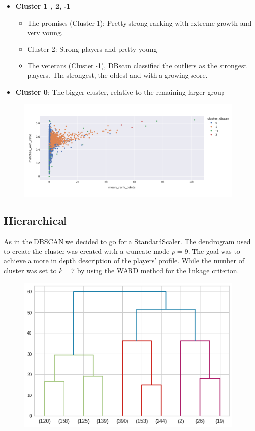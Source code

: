\documentclass{article}
\begin{document}
\begin{itemize}
\item \textbf{Cluster 1 , 2, -1}
    \begin{itemize}
        \item The promises (Cluster 1): Pretty strong ranking with extreme growth and very young.
	    \item Cluster 2: Strong players and pretty young
	    \item The veterans (Cluster -1), DBscan classified the outliers as the strongest players. The strongest, the oldest and with a growing score.
	 \end{itemize}
\item \textbf{Cluster 0}: The bigger cluster, relative to the remaining larger group
\end{itemize}	

\begin{figure}[h]
\centering
\includegraphics[width=\textwidth]{plots/dbscan/dbscan_results}
\label{fig:dbscan_results}
\end{figure}

\subsection{Hierarchical}
As in the DBSCAN we decided to go for a StandardScaler. The dendrogram used to create the cluster was created with a truncate mode $p=9$. The goal was to achieve a more in depth description of the players' profile. While the number of cluster was set to $k=7$ by using the WARD method for the linkage criterion.

\begin{figure}[h]
\centering
\includegraphics[width=.6\textwidth]{plots/hierarchical/hierarchical_dendrogram}
\label{fig:hierarchical_dendrogram}
\end{figure}
\end{document}
